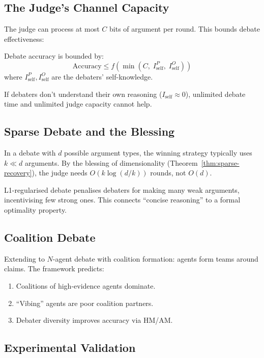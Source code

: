 \subsection{The Judge's Channel Capacity}

The judge can process at most $C$ bits of argument per round. This bounds debate effectiveness:

\begin{theorem}
Debate accuracy is bounded by:
\begin{equation}
    \text{Accuracy} \leq f(\min(C,\; I_{\text{self}}^P,\; I_{\text{self}}^O))
\end{equation}
where $I_{\text{self}}^P, I_{\text{self}}^O$ are the debaters' self-knowledge.
\end{theorem}

If debaters don't understand their own reasoning ($I_{\text{self}} \approx 0$), unlimited debate time and unlimited judge capacity cannot help.

\subsection{Sparse Debate and the Blessing}

In a debate with $d$ possible argument types, the winning strategy typically uses $k \ll d$ arguments. By the blessing of dimensionality (Theorem~\ref{thm:sparse-recovery}), the judge needs $O(k \log(d/k))$ rounds, not $O(d)$.

L1-regularised debate penalises debaters for making many weak arguments, incentivising few strong ones. This connects ``concise reasoning'' to a formal optimality property.

\subsection{Coalition Debate}

Extending to $N$-agent debate with coalition formation: agents form teams around claims. The framework predicts:
\begin{enumerate}
    \item Coalitions of high-evidence agents dominate.
    \item ``Vibing'' agents are poor coalition partners.
    \item Debater diversity improves accuracy via HM/AM.
\end{enumerate}

\subsection{Experimental Validation}

